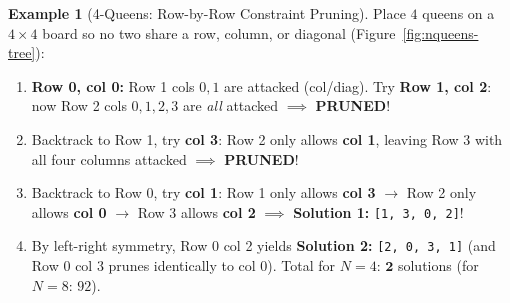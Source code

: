 \documentclass[11pt,a4paper]{article}
\theoremstyle{definition}
\newtheorem{example}{Example}[section]
\begin{document}
\begin{example}[4-Queens: Row-by-Row Constraint Pruning]
Place $4$ queens on a $4 \times 4$ board so no two share a row, column, or diagonal (Figure~\ref{fig:nqueens-tree}):
\begin{enumerate}
    \item \textbf{Row 0, col 0:} Row 1 cols $0, 1$ are attacked (col/diag). Try \textbf{Row 1, col 2}: now Row 2 cols $0, 1, 2, 3$ are \emph{all} attacked $\implies$ \textbf{PRUNED}!
    \item Backtrack to Row 1, try \textbf{col 3}: Row 2 only allows \textbf{col 1}, leaving Row 3 with all four columns attacked $\implies$ \textbf{PRUNED}!
    \item Backtrack to Row 0, try \textbf{col 1}: Row 1 only allows \textbf{col 3} $\to$ Row 2 only allows \textbf{col 0} $\to$ Row 3 allows \textbf{col 2} $\implies$ \textbf{Solution 1:} \texttt{[1, 3, 0, 2]}!
    \item By left-right symmetry, Row 0 col 2 yields \textbf{Solution 2:} \texttt{[2, 0, 3, 1]} (and Row 0 col 3 prunes identically to col 0). Total for $N = 4$: $\mathbf{2}$ solutions (for $N = 8$: $92$).
\end{enumerate}
\end{example}
\end{document}
